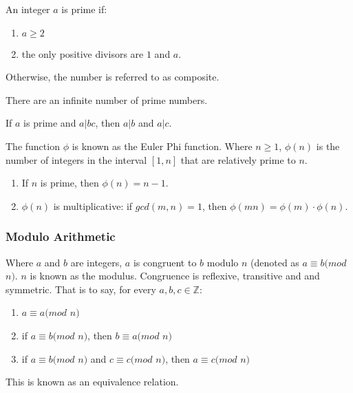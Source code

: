 \begin{mathdef}
	An integer $a$ is prime if:
	\begin{enumerate}
		\item $a\ge2$
		\item the only positive divisors are $1$ and $a$.
	\end{enumerate}
	Otherwise, the number is referred to as composite.
\end{mathdef}

\begin{mathfact}
	There are an infinite number of prime numbers.
\end{mathfact}

\begin{mathdef}
	If $a$ is prime and $a|bc$, then $a|b$ and $a|c$.
\end{mathdef}

\begin{mathdef}
	The function $\phi$ is known as the Euler Phi function. Where $n\ge1$, $\phi(n)$ is the number of integers in the interval $[1,n]$ that are relatively prime to $n$.
	\begin{enumerate}
		\item If $n$ is prime, then $\phi(n) = n - 1$.
		\item $\phi(n)$ is multiplicative: if $gcd(m,n) = 1$, then $\phi(mn) = \phi(m) \cdot  \phi(n)$.
	\end{enumerate}
\end{mathdef}

\subsubsection{Modulo Arithmetic}

\begin{mathdef}
	Where $a$ and $b$ are integers, $a$ is congruent to $b$ modulo $n$ (denoted as $a \equiv b (mod$ $n)$. $n$ is known as the modulus. Congruence is reflexive, transitive and and symmetric. That is to say, for every $a,b,c \in \mathbb{Z}$:
	\begin{enumerate}
		\item $a \equiv a (mod$ $n)$
		\item if $a \equiv b (mod$ $n)$, then $b \equiv a (mod$ $n)$
		\item if $a \equiv b (mod$ $n)$ and $c \equiv c (mod$ $n)$, then $a \equiv c (mod$ $n)$
	\end{enumerate}
	This is known as an equivalence relation.
\end{mathdef}

